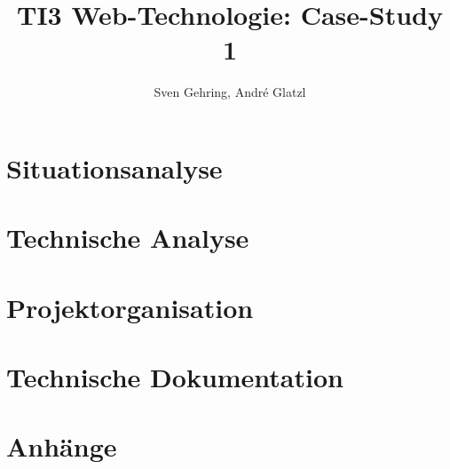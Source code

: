 \documentclass{article}
\begin{document}

\title{\vspace{-2cm}TI3 Web-Technologie: Case-Study 1}
\author{Sven Gehring, André Glatzl}
\date{}
\maketitle

\begin{abstract}

\end{abstract}

\tableofcontents

\clearpage
\section{Situationsanalyse}




\section{Technische Analyse}




\clearpage
\section{Projektorganisation}





\clearpage
\section{Technische Dokumentation}


\clearpage


\clearpage
\section{Anhänge}


\end{document}
